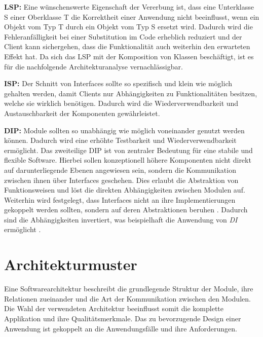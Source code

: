 \textbf{\acrfull{LSP}: } {Eine wünschenswerte Eigenschaft der Vererbung ist, dass eine Unterklasse S einer Oberklasse T die Korrektheit einer Anwendung nicht beeinflusst, wenn ein Objekt vom Typ T durch ein Objekt vom Typ S ersetzt wird. Dadurch wird die Fehleranfälligkeit bei einer Substitution im Code erheblich reduziert und der Client kann sichergehen, dass die Funktionalität auch weiterhin den erwarteten Effekt hat. Da sich das LSP mit der Komposition von Klassen beschäftigt, ist es für die nachfolgende Architekturanalyse vernachlässigbar. \cite{Martin.2018, Liskov.1994}}

\textbf{\acrfull{ISP}: } {Der Schnitt von Interfaces sollte so spezifisch und klein wie möglich gehalten werden, damit Clients nur Abhängigkeiten zu Funktionalitäten besitzen, welche sie wirklich benötigen. Dadurch wird die Wiederverwendbarkeit und Austauschbarkeit der Komponenten gewährleistet. \cite{Martin.2018}\cite[S. 135ff.]{Martin.2003}}

\textbf{\acrfull{DIP}: } {Module sollten so unabhängig wie möglich voneinander genutzt werden können. Dadurch wird eine erhöhte Testbarkeit und Wiederverwendbarkeit ermöglicht. Das zweiteilige DIP ist von zentraler Bedeutung für eine stabile und flexible Software. Hierbei sollen konzeptionell höhere Komponenten nicht direkt auf darunterliegende Ebenen angewiesen sein, sondern die Kommunikation zwischen ihnen über Interfaces geschehen. Dies erlaubt die Abstraktion von Funktionsweisen und löst die direkten Abhängigkeiten zwischen Modulen auf. Weiterhin wird festgelegt, dass Interfaces nicht an ihre Implementierungen gekoppelt werden sollten, sondern auf deren Abstraktionen beruhen \cite{Martin.1996, Martin.2018}. Dadurch sind die Abhängigkeiten invertiert, was beispielhaft die Anwendung von \emph{\Gls{DI}} ermöglicht \cite{Fowler.2004}.}


\section{Architekturmuster}

Eine Softwarearchitektur beschreibt die grundlegende Struktur der Module, ihre Relationen zueinander und die Art der Kommunikation zwischen den Modulen. Die Wahl der verwendeten Architektur beeinflusst somit die komplette Applikation und ihre Qualitätsmerkmale. Das zu bevorzugende Design einer Anwendung ist gekoppelt an die Anwendungsfälle und ihre Anforderungen. 

